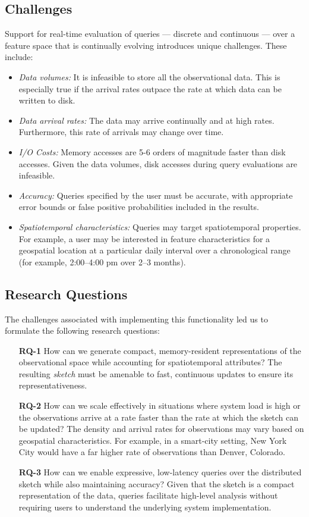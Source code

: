 \subsection{Challenges}
Support for real-time evaluation of queries --- discrete and continuous --- over a feature space that is continually evolving introduces unique challenges. These include:
\begin{itemize}
    \item   \emph{Data volumes:} It is infeasible to store all the observational data. This is especially true if the arrival rates outpace the rate at which data can be written to disk.
    \item   \emph{Data arrival rates:} The data may arrive continually and at high rates. Furthermore, this rate of arrivals may change over time.
    \item \emph{I/O Costs:} Memory accesses are 5-6 orders of magnitude faster than disk accesses. Given the data volumes, disk accesses during query evaluations are infeasible.
    \item   \emph{Accuracy:} Queries specified by the user must be accurate, with appropriate error bounds or false positive probabilities included in the results.
    \item   \emph{Spatiotemporal characteristics:} Queries may target spatiotemporal properties. For example, a user may be interested in feature characteristics for a geospatial location at a particular daily interval over a chronological range (for example, 2:00--4:00 pm over 2--3 months).
\end{itemize}

\subsection{Research Questions}
The challenges associated with implementing this functionality led us to formulate the following research questions:
\begin{itemize}
    \item[\textbf{RQ-1}]   How can we generate compact, memory-resident representations of the observational space while accounting for spatiotemporal attributes? The resulting \emph{sketch} must be amenable to fast, continuous updates to ensure its representativeness.
    \item[\textbf{RQ-2}]   How can we scale effectively in situations where system load is high or the observations arrive at a rate faster than the rate at which the sketch can be updated? The density and arrival rates for observations may vary based on geospatial characteristics. For example, in a smart-city setting, New York City would have a far higher rate of observations than Denver, Colorado.
    \item[\textbf{RQ-3}]   How can we enable expressive, low-latency queries over the distributed sketch while also maintaining accuracy?  Given that the sketch is a compact representation of the data, queries facilitate high-level analysis without requiring users to understand the underlying system implementation.
\end{itemize}

